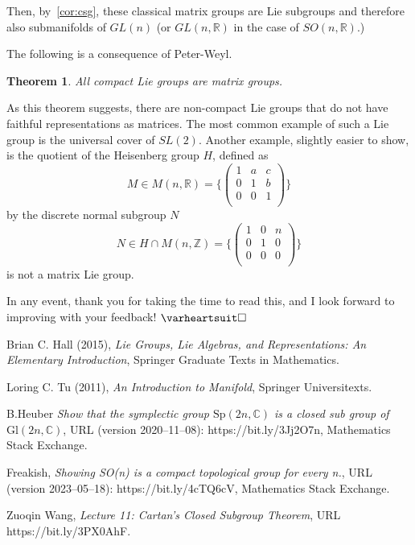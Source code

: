 \documentclass[12pt]{article}
\newcommand{\R}{\mathbb{R}}
\newcommand{\Z}{\mathbb{Z}}
\newcommand{\son}{SO (n, \R)}
\newcommand{\heart}{\ensuremath\varheartsuit}
\newtheorem{them}{Theorem}[section]
\theoremstyle{definition}
\theoremstyle{definition}
\theoremstyle{definition}
\theoremstyle{definition}
\theoremstyle{definition}
\theoremstyle{definition}
\theoremstyle{definition}
\theoremstyle{definition}
\begin{document}
Then, by~\ref{cor:csg}, these classical matrix
groups are Lie subgroups and therefore also
submanifolds of $GL(n)$ (or $GL(n, \R)$ in the case
of $\son$.)

\par{The following is a consequence of Peter-Weyl.}
\begin{them}
    All compact Lie groups
    are matrix groups.
\end{them}
\par{As this theorem suggests, there are
non-compact Lie groups that do not have faithful
representations as matrices. The most common
example of such a Lie group is the universal cover
of $SL(2)$. Another example, slightly easier to
show, is the quotient of the Heisenberg group $H$,
defined as
\[M \in M(n, \R) = \Bigg\{
\begin{pmatrix}
    1&a&c\\
    0&1&b\\
    0&0&1\\
\end{pmatrix} \Bigg\} \] 
by the discrete normal subgroup $N$
\[
    N \in H \cap M(n,\Z) = \Bigg\{
\begin{pmatrix}
    1&0&n\\
    0&1&0\\
    0&0&0\\
\end{pmatrix} \Bigg\}
\] is not a matrix Lie group.}

\vspace{6pt}
\par{In any event, thank you for taking the time
to read this, and I look forward to improving with
your feedback! $\heart \square$}

\begin{thebibliography}{9}
{Brian C. Hall (2015), \emph{Lie Groups, Lie Algebras,
and Representations: An Elementary
Introduction}, Springer Graduate Texts in Mathematics.}

Loring C. Tu (2011), \emph{An Introduction to Manifold},
Springer Universitexts.

B.Heuber \emph{Show that the symplectic group
$\mathrm{Sp}(2n,\mathbb{C})$ is a closed sub group
of $\mathrm{Gl}(2n,\mathbb{C})$}, URL (version
2020--11--08): https://bit.ly/3Jj2O7n, Mathematics Stack Exchange.

Freakish, \emph{Showing SO(n) is a compact
topological group for every n.}, URL (version
2023--05--18): https://bit.ly/4cTQ6cV, Mathematics Stack
Exchange.

Zuoqin Wang, \emph{Lecture 11: Cartan’s Closed
Subgroup Theorem}, URL https://bit.ly/3PX0AhF.
\end{thebibliography}
\end{document}
